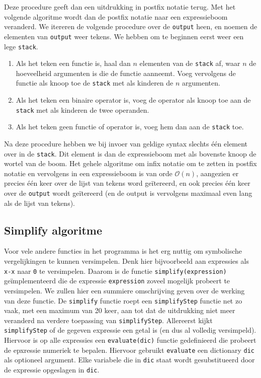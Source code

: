\documentclass[a4paper]{article}
\newcommand{\ttt}[1]{\texttt{#1}}
\begin{document}
Deze procedure geeft dan een uitdrukking in postfix notatie terug. Met het volgende algoritme wordt dan de postfix notatie naar een expressieboom veranderd. We itereren de volgende procedure over de \ttt{output} heen, en noemen de elementen van \ttt{output} weer tekens. We hebben om te beginnen eerst weer een lege \ttt{stack}.
\begin{enumerate}
\item Als het teken een functie is, haal dan $n$ elementen van de \ttt{stack} af, waar $n$ de hoeveelheid argumenten is die de functie aanneemt. Voeg vervolgens de functie als knoop toe de \ttt{stack} met als kinderen de $n$ argumenten. 
\item Als het teken een binaire operator is, voeg de operator als knoop toe aan de \ttt{stack} met als kinderen de twee operanden.
\item Als het teken geen functie of operator is, voeg hem dan aan de \ttt{stack} toe.
\end{enumerate}
Na deze procedure hebben we bij invoer van geldige syntax slechts \'e\'en element over in de \ttt{stack}. Dit element is dan de expressieboom met als bovenste knoop de wortel van de boom. Het gehele algoritme om infix notatie om te zetten in postfix notatie en vervolgens in een expressieboom is van orde $\mathcal{O}(n)$, aangezien er precies \'e\'en keer over de lijst van tekens word ge\"itereerd, en ook precies \'e\'en keer over de \ttt{output} wordt ge\"itereerd (en de output is vervolgens maximaal even lang als de lijst van tekens).

\subsection{Simplify algoritme}
Voor vele andere functies in het programma is het erg nuttig om symbolische vergelijkingen te kunnen versimpelen. Denk hier bijvoorbeeld aan expressies als \ttt{x-x} naar \ttt{0} te versimpelen. Daarom is de functie \ttt{simplify(expression)} ge\"implementeerd die de expressie \ttt{expression} zoveel mogelijk probeert te versimpelen. We zullen hier een summiere omschrijving geven over de werking van deze functie. De \ttt{simplify} functie roept een \ttt{simplifyStep} functie net zo vaak, met een maximum van 20 keer, aan tot dat de uitdrukking niet meer veranderd na verdere toepassing van \ttt{simplifyStep}. Allereerst kijkt \ttt{simplifyStep} of de gegeven expressie een getal is (en dus al volledig versimpeld). Hiervoor is op alle expressies een \ttt{evaluate(dic)} functie gedefinieerd die probeert de epxressie numeriek te bepalen. Hiervoor gebruikt \ttt{evaluate} een dictionary \ttt{dic} als optioneel argument. Elke variabele die in \ttt{dic} staat wordt gesubstitueerd door de expressie opgeslagen in \ttt{dic}.
\end{document}
